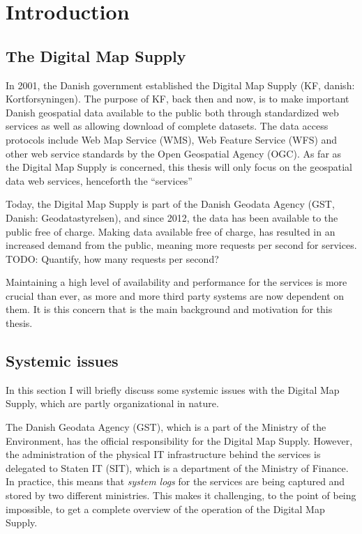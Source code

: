 \section{Introduction}

\subsection{The Digital Map Supply}
In 2001, the Danish government established the Digital Map Supply (KF, danish: Kortforsyningen). The purpose of KF, back then and now, is to make important Danish geospatial data available to the public both through standardized web services as well as allowing download of complete datasets. The data access protocols include Web Map Service (WMS), Web Feature Service (WFS) and other web service standards by the Open Geospatial Agency (OGC). As far as the Digital Map Supply is concerned, this thesis will only focus on the geospatial data web services, henceforth the ``services''

Today, the Digital Map Supply is part of the Danish Geodata Agency (GST, Danish: Geodatastyrelsen), and since 2012, the data has been available to the public free of charge. Making data available free of charge, has resulted in an increased demand from the public, meaning more requests per second for services. TODO: Quantify, how many requests per second?

Maintaining a high level of availability and performance for the services is more crucial than ever, as more and more third party systems are now dependent on them. It is this concern that is the main background and motivation for this thesis.


\subsection{Systemic issues}
\label{sec:systemic:issues}
In this section I will briefly discuss some systemic issues with the Digital Map Supply, which are partly organizational in nature.

The Danish Geodata Agency (GST), which is a part of the Ministry of the Environment, has the official responsibility for the Digital Map Supply. However, the administration of the physical IT infrastructure behind the services is delegated to Staten IT (SIT), which is a department of the Ministry of Finance. In practice, this means that \emph{system logs} for the services are being captured and stored by two different ministries. This makes it challenging, to the point of being impossible, to get a complete overview of the operation of the Digital Map Supply.

